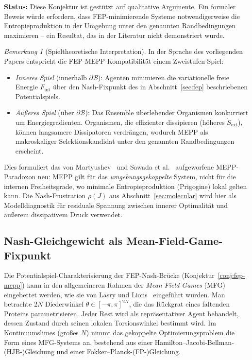 \documentclass[12pt,a4paper]{article}
\theoremstyle{remark}
\newtheorem{remark}{Bemerkung}
\begin{document}
\noindent\textbf{Status:} Diese Konjektur ist gestützt auf qualitative Argumente. Ein formaler Beweis würde erfordern, dass FEP-minimierende Systeme notwendigerweise die Entropieproduktion in der Umgebung unter den genannten Randbedingungen maximieren -- ein Resultat, das in der Literatur nicht demonstriert wurde.

\begin{remark}[Spieltheoretische Interpretation]
In der Sprache des vorliegenden Papers entspricht die FEP-MEPP-Kompatibilität einem Zweistufen-Spiel:
\begin{itemize}
  \item \emph{Inneres Spiel} (innerhalb $\partial\mathcal{B}$): Agenten minimieren die variationelle freie Energie $F_{\mathrm{int}}$ über den Nash-Fixpunkt des in Abschnitt~\ref{sec:fep} beschriebenen Potentialspiels.
  \item \emph{Äußeres Spiel} (über $\partial\mathcal{B}$): Das Ensemble überlebender Organismen konkurriert um Energiegradienten. Organismen, die effizienter dissipieren (höheres $\dot{S}_{\mathrm{ext}}$), können langsamere Dissipatoren verdrängen, wodurch MEPP als makroskaliger Selektionskandidat unter den genannten Randbedingungen erscheint.
\end{itemize}
Dies formuliert das von Martyushev~\cite{Martyushev2010} und Sawada et al.~\citep{Toma2025} aufgeworfene MEPP-Paradoxon neu: MEPP gilt für das \emph{umgebungsgekoppelte} System, nicht für die internen Freiheitsgrade, wo minimale Entropieproduktion (Prigogine) lokal gelten kann. Die Nash-Frustration $\rho(J)$ aus Abschnitt~\ref{sec:molecular} wird hier als Modelldiagnostik für residuale Spannung zwischen innerer Optimalität und äußerem dissipativem Druck verwendet.
\end{remark}

\subsection{Nash-Gleichgewicht als Mean-Field-Game-Fixpunkt}\label{sec:mfg-fixpoint}

Die Potentialspiel-Charakterisierung der FEP-Nash-Brücke (Konjektur~\ref{conj:fep-mepp}) kann in den allgemeineren Rahmen der \emph{Mean Field Games} (MFG) eingebettet werden, wie sie von Lasry und Lions~\cite{LasryLions2007} eingeführt wurden. Man betrachte $2N$ Diederwinkel $\theta\in[-\pi,\pi]^{2N}$, die das Rückgrat eines faltenden Proteins parametrisieren. Jeder Rest wird als repräsentativer Agent behandelt, dessen Zustand durch seinen lokalen Torsionswinkel bestimmt wird. Im Kontinuumslimes (großes $N$) nimmt das gekoppelte Optimierungsproblem die Form eines MFG-Systems an, bestehend aus einer Hamilton--Jacobi-Bellman-(HJB-)Gleichung und einer Fokker--Planck-(FP-)Gleichung.
\end{document}
